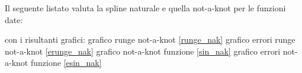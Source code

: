  Il seguente listato valuta la spline naturale e quella not-a-knot per le funzioni date:



con i risultanti grafici:
grafico runge not-a-knot \ref{runge_nak}
grafico errori runge not-a-knot \ref{erunge_nak}
grafico not-a-knot funzione \ref{sin_nak}
grafico errori not-a-knot funzione \ref{esin_nak}